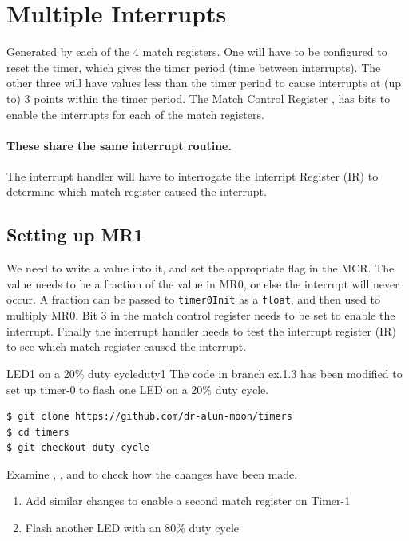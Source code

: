 \documentclass[a4paper]{tufte-handout}
\begin{document}
\clearpage
\section{Multiple Interrupts}
  Generated by
each of the 4 match registers.  One will have to be configured to
reset the timer, which gives the timer period (time between
interrupts).  The other three will have values less than the timer
period to cause interrupts at (up to) 3 points within the timer
period.  The Match Control Register \citep[24.6.6]{lpc4088}, has bits
to enable the interrupts for each of the match registers.  
\paragraph{These share the same interrupt routine.}  The interrupt
handler will have to interrogate the Interript Register (IR)
\citep[24.6.1]{lpc4088} to determine which match register caused the
interrupt.

\subsection{Setting up MR1}
  We need to write a value
into it, and set the appropriate flag in the MCR.  The value needs to
be a fraction of the value in MR0, or else the interrupt will never
occur.  A fraction can be passed to \texttt{timer0Init} as a
\texttt{float}, and then used to multiply MR0.  Bit 3 in the match
control register needs to be set to enable the interrupt.  Finally the
interrupt handler needs to test the interrupt register (IR) to see
which match register caused the interrupt.

\begin{exercise}{LED1 on a 20\% duty cycle}{duty1}
The code in branch ex.1.3 has been modified to set up timer-0 to flash
one LED on a 20\% duty cycle.
\begin{verbatim}
$ git clone https://github.com/dr-alun-moon/timers
$ cd timers
$ git checkout duty-cycle
\end{verbatim}
Examine , , and  to check how
the changes have been made.

\begin{enumerate}
\item Add similar changes to enable a second match register on Timer-1
\item Flash another LED with an 80\% duty cycle
\end{enumerate}

\end{exercise}
\end{document}
